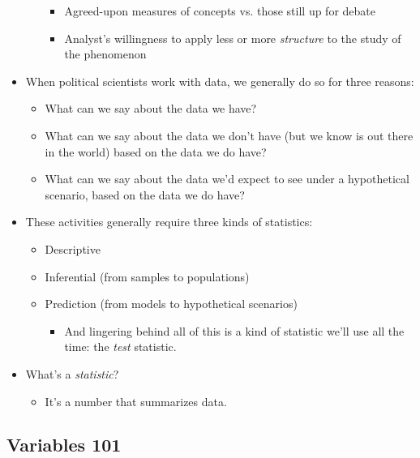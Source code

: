 \documentclass[11pt]{article}
\begin{document}
\begin{itemize}
\begin{itemize}
\begin{itemize}
\item Agreed-upon measures of concepts vs. those still up for debate

\item Analyst's willingness to apply less or more \textit{structure} to the
study of the phenomenon
\end{itemize}
\end{itemize}

\item When political scientists work with data, we generally do so for three
reasons:

\begin{itemize}
\item What can we say about the data we have?

\item What can we say about the data we don't have (but we know is out there
in the world) based on the data we do have?

\item What can we say about the data we'd expect to see under a hypothetical
scenario, based on the data we do have?
\end{itemize}

\item These activities generally require three kinds of statistics:

\begin{itemize}
\item Descriptive

\item Inferential (from samples to populations)

\item Prediction (from models to hypothetical scenarios)

\begin{itemize}
\item And lingering behind all of this is a kind of statistic we'll use all
the time: the \textit{test }statistic.
\end{itemize}
\end{itemize}

\item What's a \textit{statistic}? \ 

\begin{itemize}
\item It's a number that summarizes data.
\end{itemize}
\end{itemize}

\subsection{Variables 101}
\end{document}
